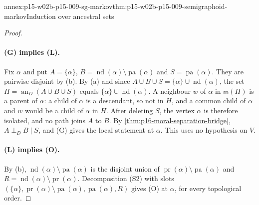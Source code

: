 \begin{annexitem}{annex:p15-w02b-p15-009-sg-markov}{thm:p15-w02b-p15-009-semigraphoid-markov}{Induction over ancestral sets}
\begin{proof}
\paragraph{(G) implies (L).}
Fix \(\alpha\) and put \(A=\{\alpha\}\),
\(B=\operatorname{nd}(\alpha)\setminus\operatorname{pa}(\alpha)\) and
\(S=\operatorname{pa}(\alpha)\). They are pairwise disjoint by (b).
By (a) and since \(A\cup B\cup S=\{\alpha\}\cup\operatorname{nd}(\alpha)\),
the set \(H=\operatorname{an}_D(A\cup B\cup S)\) equals
\(\{\alpha\}\cup\operatorname{nd}(\alpha)\). A neighbour \(w\) of
\(\alpha\) in \(\mathsf m(H)\) is a parent of \(\alpha\): a child of
\(\alpha\) is a descendant, so not in \(H\), and a common child of
\(\alpha\) and \(w\) would be a child of \(\alpha\) in \(H\). After
deleting \(S\), the vertex \(\alpha\) is therefore isolated, and no path
joins \(A\) to \(B\). By \cref{thm:p16-moral-separation-bridge},
\(A\mathrel{\perp_D}B\mid S\), and (G) gives the local statement at
\(\alpha\). This uses no hypothesis on \(V\).

\paragraph{(L) implies (O).}
By (b), \(\operatorname{nd}(\alpha)\setminus\operatorname{pa}(\alpha)\)
is the disjoint union of
\(\operatorname{pr}(\alpha)\setminus\operatorname{pa}(\alpha)\) and
\(R=\operatorname{nd}(\alpha)\setminus\operatorname{pr}(\alpha)\).
Decomposition (S2) with slots
\((\{\alpha\},\operatorname{pr}(\alpha)\setminus\operatorname{pa}(\alpha),
\operatorname{pa}(\alpha),R)\) gives (O) at \(\alpha\), for every
topological order.


\end{proof}
\end{annexitem}
